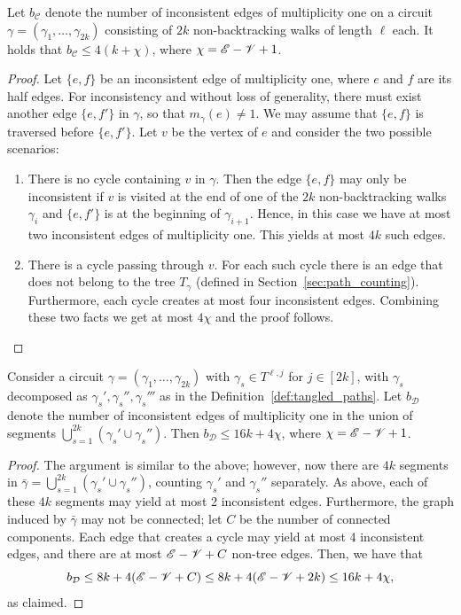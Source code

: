 \begin{lemma} 
Let $b_\mathcal{C}$ 
denote the number of inconsistent edges of multiplicity one 
on a circuit 
$\gamma = (\gamma_1, \ldots, \gamma_{2k})$ 
consisting of $2k$ non-backtracking walks of length $\ell$ each. 
It holds that
$ b_\mathcal{C} \leq 4 (k + \chi)$, 
where $\chi=\mathscr{E}-\mathscr{V}+1$.
\label{lem:inconsistent}
\end{lemma}
\begin{proof}
Let $\{e,f\}$ be an inconsistent edge of multiplicity one, where
$e$ and $f$ are its half edges.
For inconsistency and without loss of generality,
there must exist 
another edge
$\{e,f'\}$ in $\gamma$,
so that
$m_\gamma (e) \neq 1$.
We may assume that $\{e,f\}$ is traversed before $\{e,f'\}$. 
Let $v$ be the vertex of $e$ and consider the two possible scenarios:
\begin{enumerate}[{Case} 1:]
    \item There is no cycle containing $v$ in $\gamma$.
    Then the edge $\{e,f\}$ may only be inconsistent
    if $v$ is visited 
    at the end of one of the $2k$ non-backtracking walks $\gamma_i$ and
    $\{e,f'\}$ is at the beginning of $\gamma_{i+1}$. 
    Hence, in this case we have at most two inconsistent edges of multiplicity one. 
    This yields at most $4k$ such edges.
    \item There is a cycle passing through $v$. 
    For each such cycle there is an edge that does not belong to the tree 
    $T_{\gamma}$ (defined in Section~\ref{sec:path_counting}). 
    Furthermore, each cycle creates at most four inconsistent edges. 
    Combining these two facts we get at most $4\chi$ and the proof follows.
\end{enumerate}
\end{proof}

\begin{lemma}\label{lem:inconsistent_edges_reminder}
Consider a circuit $\gamma = (\gamma_1, \ldots, \gamma_{2k})$
with $\gamma_s \in T^{\ell,j}$ for $j \in [2k]$,
with $\gamma_s$ decomposed as $\gamma_s', \gamma_s'', \gamma_s'''$
as in the Definition~\ref{def:tangled_paths}.
Let 
$b_\mathcal{D}$ 
denote the number of inconsistent edges of multiplicity one 
in the union of segments
$\bigcup_{s=1}^{2k} (\gamma_s' \cup \gamma_s'')$.
Then 
$b_\mathcal{D} 
\leq 
16k+4 \chi$, 
where
$\chi = \mathscr{E} - \mathscr{V} + 1$.
\label{lem:inconsistent_tangled}
\end{lemma}

\begin{proof}
The argument is similar to the above; however, now there are $4k$ segments
in $\bar\gamma = \bigcup_{s=1}^{2k} (\gamma_s' \cup \gamma_s'')$,
counting $\gamma_s'$ and $\gamma_s''$ separately.
As above, each of these $4k$ segments may yield at most 2 inconsistent edges.
Furthermore, the graph induced by $\bar\gamma$ may not be connected;
let $C$ be the number of connected components.
Each edge that creates a cycle may yield at most 4 inconsistent edges,
and there are at most $\mathscr{E} - \mathscr{V} + C$ non-tree edges.
Then, we have that
\[
b_\mathcal{D} 
\leq 8 k + 4 (\mathscr{E} - \mathscr{V} + C) 
\leq 8k + 4 (\mathscr{E} - \mathscr{V} + 2k)
\leq 16 k + 4 \chi,
\]
as claimed.
\end{proof}

